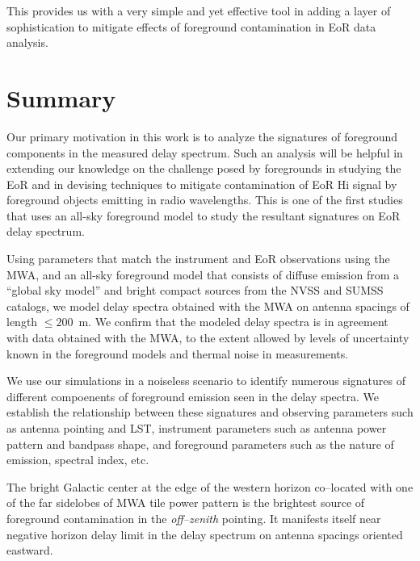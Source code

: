 \documentclass[preprint2,iop,numberedappendix]{emulateapj}
\begin{document}
This provides us with a very simple and yet effective tool in adding a layer of sophistication to mitigate effects of foreground contamination in EoR data analysis. %


\section{Summary}\label{sec:summary}

Our primary motivation in this work is to analyze the signatures of foreground components in the measured delay spectrum. Such an analysis will be helpful in extending our knowledge on the challenge posed by foregrounds in studying the EoR and in devising techniques to mitigate contamination of EoR H{\sc i} signal by foreground objects emitting in radio wavelengths. This is one of the first studies that uses an all-sky foreground model to study the resultant signatures on EoR delay spectrum.

Using parameters that match the instrument and EoR observations using the MWA, and an all-sky foreground model that consists of diffuse emission from a ``global sky model'' and bright compact sources from the NVSS and SUMSS catalogs, we model delay spectra obtained with the MWA on antenna spacings of length $\le 200$~m. We confirm that the modeled delay spectra is in agreement with data obtained with the MWA, to the extent allowed by levels of uncertainty known in the foreground models and thermal noise in measurements. 

We use our simulations in a noiseless scenario to identify numerous signatures of different compoenents of foreground emission seen in the delay spectra. We establish the relationship between these signatures and observing parameters such as antenna pointing and LST, instrument parameters such as antenna power pattern and bandpass shape, and foreground parameters such as the nature of emission, spectral index, etc. 

The bright Galactic center at the edge of the western horizon co--located with one of the far sidelobes of MWA tile power pattern is the brightest source of foreground contamination in the {\it off--zenith} pointing. It manifests itself near negative horizon delay limit in the delay spectrum on antenna spacings oriented eastward. 
\end{document}
